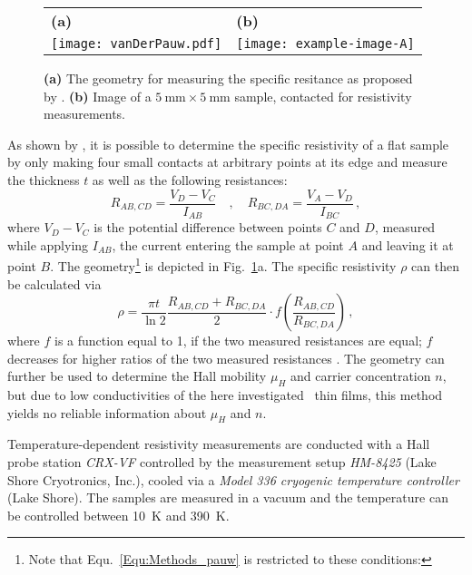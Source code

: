 \begin{figure}
    \centering
    \begin{tabular}{ll}
        \textbf{(a)} & \textbf{(b)} \\
        \texttt{[image: vanDerPauw.pdf]}
        & \texttt{[image: example-image-A]}
    \end{tabular}
    \caption{\textbf{(a)} The geometry for measuring the specific resitance as proposed by \textcite{pauw1958}. \textbf{(b)} Image of a $\qty{5}{\mm}\times\qty{5}{\mm}$ sample, contacted for resistivity measurements. \tbd}
    \label{Fig:Methods_pauwGeometry}
\end{figure}

As shown by \textcite{pauw1958}, it is possible to determine the specific resistivity of a flat sample by only making four small contacts at arbitrary points at its edge and measure the thickness $t$ as well as the following resistances:
\begin{equation}
    R_{AB,CD}=\frac{V_D-V_C}{I_{AB}}\quad , \quad
    R_{BC,DA}=\frac{V_A-V_D}{I_{BC}}\,,
\end{equation}
where $V_D-V_C$ is the potential difference between points $C$ and $D$, measured while applying $I_{AB}$, the current entering the sample at point $A$ and leaving it at point $B$.
The geometry\footnote{
    Note that Equ.~\ref{Equ:Methods_pauw} is restricted to these conditions:
} is depicted in Fig.~\ref{Fig:Methods_pauwGeometry}a.
The specific resistivity $\rho$ can then be calculated via
\begin{equation}
    \label{Equ:Methods_pauw}
    \rho=
    \frac{\pi t}{\ln2}
    \frac{R_{AB,CD}+R_{BC,DA}}{2}
    \cdot f\left(\frac{R_{AB,CD}}{R_{BC,DA}}\right)\,,
\end{equation}
where $f$ is a function equal to 1, if the two measured resistances are equal; $f$ decreases for higher ratios of the two measured resistances
    \cite{pauw1958}.
The geometry can further be used to determine the Hall mobility $\mu_H$ and carrier concentration $n$, but due to low conductivities of the here investigated \cro\ thin films, this method yields no reliable information about $\mu_H$ and $n$.

Temperature-dependent resistivity measurements are conducted with a Hall probe station \textit{CRX-VF} controlled by the measurement setup \textit{HM-8425} (Lake Shore Cryotronics, Inc.), cooled via a \textit{Model 336 cryogenic temperature controller} (Lake Shore).
The samples are measured in a vacuum and the temperature can be controlled between \qty{10}{\kelvin} and \qty{390}{\kelvin}.